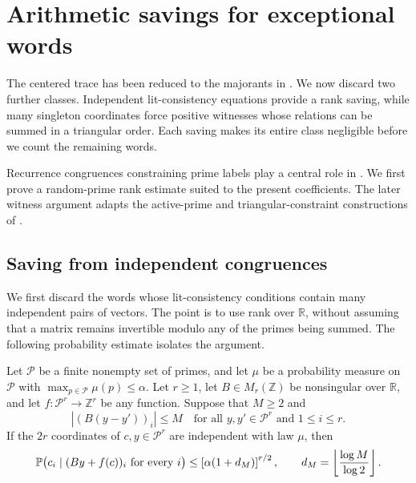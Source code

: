 \section{Arithmetic savings for exceptional words}\label{q:rank-witness-section}

The centered trace has been reduced to the majorants in
.  We now discard two further classes.
Independent lit-consistency equations provide a rank saving, while many
singleton coordinates force positive witnesses whose relations can be
summed in a triangular order.  Each saving makes its entire class
negligible before we count the remaining words.

Recurrence congruences constraining prime labels play a central role in
\cite[Sections~6--7]{HR21}.  We first prove a random-prime rank estimate
suited to the present coefficients.  The later witness argument adapts
the active-prime and triangular-constraint constructions of
\cite[Lemmas~11.6, 13.1, and~13.6]{Pilatte26}.

\subsection{Saving from independent congruences}

We first discard the words whose lit-consistency conditions contain
many independent pairs of vectors.  The point is to use rank over
$\mathbb R$, without assuming that a matrix remains invertible modulo
any of the primes being summed.  The following probability estimate
isolates the argument.

\begin{lemma}
\label{q:rank-probability}
Let $\mathscr P$ be a finite nonempty set of primes, and let $\mu$ be a
probability measure on $\mathscr P$ with
$\max_{p\in\mathscr P}\mu(p)\le\alpha$.
Let $r\ge1$, let $B\in M_r(\mathbb Z)$ be nonsingular over
$\mathbb R$, and let $f:\mathscr P^r\to\mathbb Z^r$ be any function.
Suppose that $M\ge2$ and
\[
 \left|(B(y-y'))_i\right|\le M
 \quad\text{for all }y,y'\in\mathscr P^r\text{ and }1\le i\le r.
\]
If the $2r$ coordinates of $c,y\in\mathscr P^r$ are independent with
law $\mu$, then
\begin{equation}\label{q:rank-probability-bound}
 \mathbb P\bigl(c_i\mid(By+f(c))_i\text{ for every }i\bigr)
 \le \left[\alpha(1+d_M)\right]^{r/2},
 \qquad d_M=\left\lfloor\frac{\log M}{\log2}\right\rfloor.
\end{equation}
\end{lemma}

